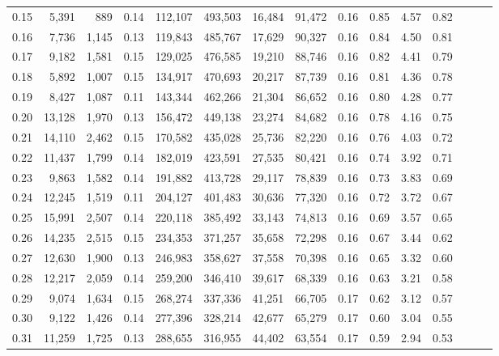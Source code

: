 \begin{tabular}{rrrrrrrrrrrrrrr}
0.15 &   5,391 &    889 &  0.14 &  112,107 &  493,503 &   16,484 &   91,472 &  0.16 &  0.85 &  4.57 &      0.82 \\
0.16 &   7,736 &  1,145 &  0.13 &  119,843 &  485,767 &   17,629 &   90,327 &  0.16 &  0.84 &  4.50 &      0.81 \\
0.17 &   9,182 &  1,581 &  0.15 &  129,025 &  476,585 &   19,210 &   88,746 &  0.16 &  0.82 &  4.41 &      0.79 \\
0.18 &   5,892 &  1,007 &  0.15 &  134,917 &  470,693 &   20,217 &   87,739 &  0.16 &  0.81 &  4.36 &      0.78 \\
0.19 &   8,427 &  1,087 &  0.11 &  143,344 &  462,266 &   21,304 &   86,652 &  0.16 &  0.80 &  4.28 &      0.77 \\
0.20 &  13,128 &  1,970 &  0.13 &  156,472 &  449,138 &   23,274 &   84,682 &  0.16 &  0.78 &  4.16 &      0.75 \\
0.21 &  14,110 &  2,462 &  0.15 &  170,582 &  435,028 &   25,736 &   82,220 &  0.16 &  0.76 &  4.03 &      0.72 \\
0.22 &  11,437 &  1,799 &  0.14 &  182,019 &  423,591 &   27,535 &   80,421 &  0.16 &  0.74 &  3.92 &      0.71 \\
0.23 &   9,863 &  1,582 &  0.14 &  191,882 &  413,728 &   29,117 &   78,839 &  0.16 &  0.73 &  3.83 &      0.69 \\
0.24 &  12,245 &  1,519 &  0.11 &  204,127 &  401,483 &   30,636 &   77,320 &  0.16 &  0.72 &  3.72 &      0.67 \\
0.25 &  15,991 &  2,507 &  0.14 &  220,118 &  385,492 &   33,143 &   74,813 &  0.16 &  0.69 &  3.57 &      0.65 \\
0.26 &  14,235 &  2,515 &  0.15 &  234,353 &  371,257 &   35,658 &   72,298 &  0.16 &  0.67 &  3.44 &      0.62 \\
0.27 &  12,630 &  1,900 &  0.13 &  246,983 &  358,627 &   37,558 &   70,398 &  0.16 &  0.65 &  3.32 &      0.60 \\
0.28 &  12,217 &  2,059 &  0.14 &  259,200 &  346,410 &   39,617 &   68,339 &  0.16 &  0.63 &  3.21 &      0.58 \\
0.29 &   9,074 &  1,634 &  0.15 &  268,274 &  337,336 &   41,251 &   66,705 &  0.17 &  0.62 &  3.12 &      0.57 \\
0.30 &   9,122 &  1,426 &  0.14 &  277,396 &  328,214 &   42,677 &   65,279 &  0.17 &  0.60 &  3.04 &      0.55 \\
0.31 &  11,259 &  1,725 &  0.13 &  288,655 &  316,955 &   44,402 &   63,554 &  0.17 &  0.59 &  2.94 &      0.53 \\

\end{tabular}
